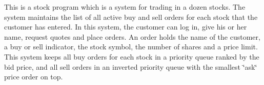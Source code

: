 This is a stock program which is a system for trading in a dozen stocks. The system maintains the list of all active buy and sell orders for each stock that the customer has entered. In this system, the customer can log in, give his or her name, request quotes and place orders. An order holds the name of the customer, a buy or sell indicator, the stock symbol, the number of shares and a price limit. This system keeps all buy orders for each stock in a priority queue ranked by the bid price, and all sell orders in an inverted priority queue with the smallest \char`\"{}ask\char`\"{} price order on top. 